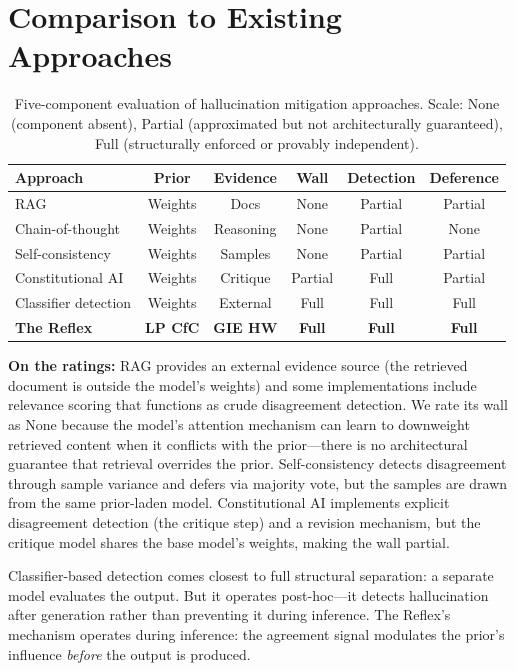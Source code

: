 \documentclass[11pt,letterpaper]{article}
\begin{document}
\section{Comparison to Existing Approaches}

\begin{table}[h]
\centering
\small
\begin{tabular}{lccccc}
\toprule
Approach & Prior & Evidence & Wall & Detection & Deference \\
\midrule
RAG \cite{lewis2020rag} & Weights & Docs & None & Partial & Partial \\
Chain-of-thought & Weights & Reasoning & None & Partial & None \\
Self-consistency \cite{wang2022selfconsistency} & Weights & Samples & None & Partial & Partial \\
Constitutional AI \cite{bai2022constitutional} & Weights & Critique & Partial & Full & Partial \\
Classifier detection & Weights & External & Full & Full & Full \\
\textbf{The Reflex} & \textbf{LP CfC} & \textbf{GIE HW} & \textbf{Full} & \textbf{Full} & \textbf{Full} \\
\bottomrule
\end{tabular}
\caption{Five-component evaluation of hallucination mitigation approaches. Scale: None (component absent), Partial (approximated but not architecturally guaranteed), Full (structurally enforced or provably independent).}
\label{tab:comparison}
\end{table}

\textbf{On the ratings:} RAG provides an external evidence source (the retrieved document is outside the model's weights) and some implementations include relevance scoring that functions as crude disagreement detection. We rate its wall as None because the model's attention mechanism can learn to downweight retrieved content when it conflicts with the prior---there is no architectural guarantee that retrieval overrides the prior. Self-consistency detects disagreement through sample variance and defers via majority vote, but the samples are drawn from the same prior-laden model. Constitutional AI implements explicit disagreement detection (the critique step) and a revision mechanism, but the critique model shares the base model's weights, making the wall partial.

Classifier-based detection \cite{azaria2023internal,manakul2023selfcheckgpt} comes closest to full structural separation: a separate model evaluates the output. But it operates post-hoc---it detects hallucination after generation rather than preventing it during inference. The Reflex's mechanism operates during inference: the agreement signal modulates the prior's influence \textit{before} the output is produced.
\end{document}
